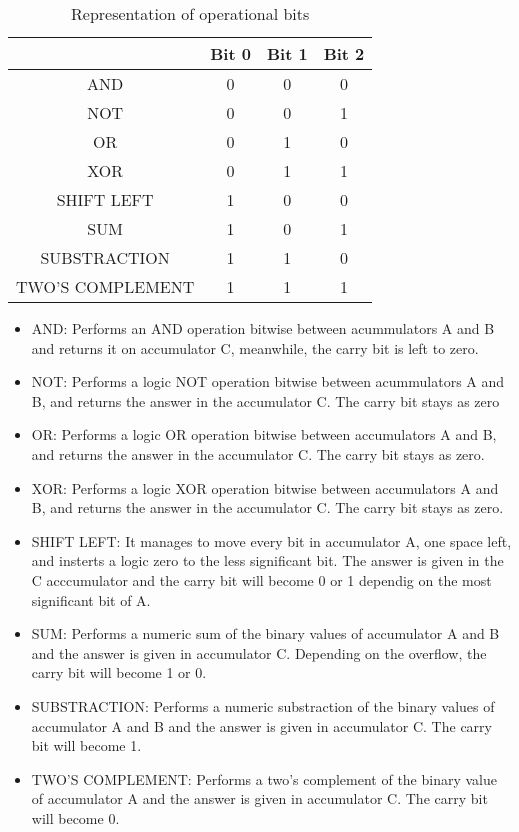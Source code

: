 \begin{table}[h!]
\begin{centering}
\begin{tabular}{|c|c|c|c|}
\hline 
 & Bit 0  & Bit 1  & Bit 2\tabularnewline
\hline 
\hline 
AND  & 0  & 0  & 0\tabularnewline
\hline 
NOT  & 0  & 0  & 1\tabularnewline
\hline 
OR  & 0  & 1  & 0\tabularnewline
\hline 
XOR  & 0  & 1  & 1\tabularnewline
\hline 
SHIFT LEFT  & 1  & 0  & 0\tabularnewline
\hline 
SUM  & 1  & 0  & 1\tabularnewline
\hline 
SUBSTRACTION  & 1  & 1  & 0\tabularnewline
\hline 
TWO'S COMPLEMENT  & 1  & 1  & 1\tabularnewline
\hline 
\end{tabular}
\par\end{centering}
\caption{Representation of operational bits}
\end{table}
\begin{itemize}
\item AND: Performs an AND operation bitwise between acummulators A and
B and returns it on accumulator C, meanwhile, the carry bit is left
to zero.
\item NOT: Performs a logic NOT operation bitwise between acummulators A
and B, and returns the answer in the accumulator C. The carry bit
stays as zero
\item OR: Performs a logic OR operation bitwise between accumulators A and
B, and returns the answer in the accumulator C. The carry bit stays
as zero.
\item XOR: Performs a logic XOR operation bitwise between accumulators A
and B, and returns the answer in the accumulator C. The carry bit
stays as zero.
\item SHIFT LEFT: It manages to move every bit in accumulator A, one space
left, and insterts a logic zero to the less significant bit. The answer
is given in the C acccumulator and the carry bit will become 0 or
1 dependig on the most significant bit of A.
\item SUM: Performs a numeric sum of the binary values of accumulator A
and B and the answer is given in accumulator C. Depending on the overflow,
the carry bit will become 1 or 0.
\item SUBSTRACTION: Performs a numeric substraction of the binary values
of accumulator A and B and the answer is given in accumulator C. The
carry bit will become 1.
\item TWO'S COMPLEMENT: Performs a two's complement of the binary value
of accumulator A and the answer is given in accumulator C. The carry
bit will become 0.
\end{itemize}

